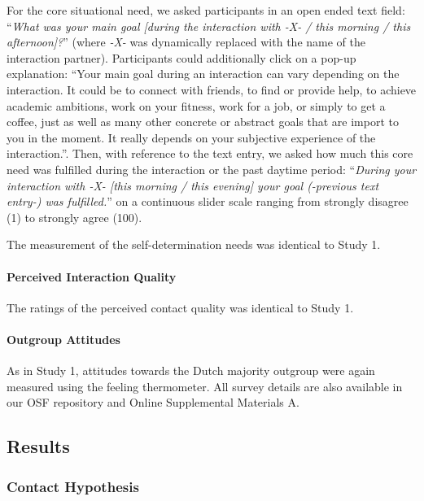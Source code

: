 For the core situational need, we asked participants in an open ended
text field:
``\textit{What was your main goal [during the interaction with -X- / this morning / this afternoon]?}''
(where \textit{-X-} was dynamically replaced with the name of the
interaction partner). Participants could additionally click on a pop-up
explanation: ``Your main goal during an interaction can vary depending
on the interaction. It could be to connect with friends, to find or
provide help, to achieve academic ambitions, work on your fitness, work
for a job, or simply to get a coffee, just as well as many other
concrete or abstract goals that are import to you in the moment. It
really depends on your subjective experience of the interaction.''.
Then, with reference to the text entry, we asked how much this core need
was fulfilled during the interaction or the past daytime period:
``\textit{During your interaction with -X- [this morning / this evening] your goal (-previous text entry-) was fulfilled.}''
on a continuous slider scale ranging from strongly disagree (1) to
strongly agree (100).

The measurement of the self-determination needs was identical to Study
1.

\paragraph{Perceived Interaction Quality}

The ratings of the perceived contact quality was identical to Study 1.

\paragraph{Outgroup Attitudes}

As in Study 1, attitudes towards the Dutch majority outgroup were again
measured using the feeling thermometer. All survey details are also
available in our OSF repository \citep{KreienkampMasked2022a} and Online
Supplemental Materials A.

\subsection{Results}

\subsubsection{Contact Hypothesis}

